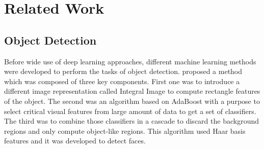 \documentclass[11pt]{article}
\begin{document}

\newpage
\section{Related Work}
\subsection{Object Detection}
Before wide use of deep learning approaches, different machine learning methods were developed to perform the tasks of object detection. \cite{viola2001rapid} proposed a method which was composed of three key components. First one was to introduce a different image representation called Integral Image to compute rectangle features of the object. The second was an algorithm based on AdaBoost with a purpose to select critical visual features from large amount of data to get a set of classifiers. The third was to combine those classifiers in a cascade to discard the background regions and only compute object-like regions. This algorithm used Haar basis features and it was developed to detect faces.
\end{document}
